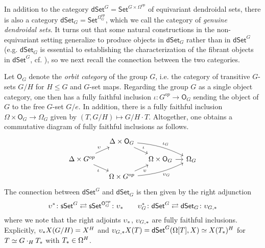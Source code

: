 \documentclass[a4paper,10pt]{article}%
\numberwithin{equation}{section}
\numberwithin{figure}{section}
\theoremstyle{definition} %
\newcommand{\dSet}{\mathsf{dSet}}
\newcommand{\1}{\ensuremath{\mathbbm 1}}%
\begin{document}
In addition to the category
$\mathsf{dSet}^G = \mathsf{Set}^{G \times \Omega^{op}}$
of equivariant dendroidal sets,
there is also a category
$\mathsf{dSet}_G = \mathsf{Set}^{\Omega_G^{op}}$,
which we call the category of 
\emph{genuine dendroidal sets}.
It turns out that
some natural constructions in the non-equivariant setting 
generalize to produce objects in 
$\mathsf{dSet}_G$
rather than in 
$\mathsf{dSet}^G$
(e.g. $\mathsf{dSet}_G$ is essential to establishing the characterization
of the fibrant objects in $\mathsf{dSet}^G$,
cf. \cite[\S 8.2]{Per18}),
so we next recall the connection between the two categories.

Let $\mathsf{O}_G$
denote the \emph{orbit category} of the group $G$,
i.e. the category of transitive $G$-sets $G/H$ for $H\leq G$ and $G$-set maps.
Regarding the group $G$ as a single object category,
one then has a fully faithful inclusion
$\iota \colon G^{op} \to \mathsf{O}_G$
sending the object of $G$ to the free $G$-set $G/e$. 
In addition, there is a fully faithful inclusion
$\Omega \times \mathsf{O}_G \to \Omega_G$
given by
$(T,G/H) \mapsto G/H \cdot T$.
Altogether, one obtains a commutative diagram of fully faithful inclusions as follows.
\begin{equation}
\begin{tikzcd}[row sep=9,column sep=11]
	&
	\Delta \times \mathsf{O}_G 
	\ar{rd}{\iota}
	\ar[bend left=10]{rrd}{\iota_G}
	&
\\
	\Delta \times G^{op} 
	\ar{ru}{\upsilon}
	\ar{rd}[swap]{\iota}
	&&
	\Omega \times \mathsf{O}_G
	\ar{r}
	&
	\Omega_G
\\
	&
	\Omega \times G^{op}
	\ar{ru}[swap]{\upsilon}
	\ar[bend right=10]{rru}[swap]{\upsilon_G}
	&
\end{tikzcd}
\end{equation}
The connection between 
$\mathsf{dSet}^G$ and $\mathsf{dSet}_G$
is then given by the right adjunction
\begin{equation}\label{UPSILONADJ EQ}
	\upsilon^{\**} \colon 
	\mathsf{sSet}^G
	\rightleftarrows
	\mathsf{sSet}^{\mathsf{O}_G^{op}}
	\colon
	\upsilon_{\**}
\qquad
	\upsilon_G^{\**} \colon 
	\mathsf{dSet}^G
	\rightleftarrows
	\mathsf{dSet}_G
	\colon
	\upsilon_{G,\**}
\end{equation}
where we note that the right adjoints 
$\upsilon_{\**}$, $\upsilon_{G,\**}$
are fully faithful inclusions.
Explicitly, 
$\upsilon_{\**} X(G/H) = X^H$ and
$\upsilon_{G,\**} X(T) = \dSet^G(\Omega[T], X) \simeq X(T_{\**})^H$
for $T \simeq G \cdot_H T_{\**}$ with $T_{\**} \in \Omega^H$.
\end{document}

